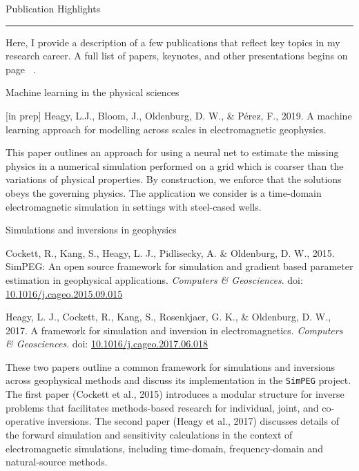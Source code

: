 \documentclass[a4paper, 11pt]{article}
\newcommand{\doi}[1]{doi: \href{https://doi.org/#1}{#1}}
\newcommand{\heading}[1]{
    \begin{minipage}[t]{\textwidth}
    \vspace{0.05cm}
    {\LARGE #1}\\
    \vspace{-0.24cm}
    \hrule
    \end{minipage}
    \vspace{0.05cm}

}
\newcommand{\subheading}[1]{
    \vspace{0.4cm}
    {\Large #1}\\
    \vspace{-0.2cm}
}
\begin{document}

\heading{Publication Highlights}

Here, I provide a description of a few publications that reflect key topics in my research career.
A full list of papers, keynotes, and other presentations begins on page ~\pageref{sec:publications}.

\subheading{Machine learning in the physical sciences}

\begin{myitemize}
    \item{[in prep] Heagy, L.J., Bloom, J., Oldenburg, D. W., \& P\'erez, F., 2019. A machine learning approach for modelling across scales in electromagnetic geophysics.}
\end{myitemize}

This paper outlines an approach for using a neural net to estimate the missing physics in a numerical simulation performed on a grid which is coarser than the variations of physical properties.
By construction, we enforce that the solutions obeys the governing physics.
The application we consider is a time-domain electromagnetic simulation in settings with steel-cased wells.

\subheading{Simulations and inversions in geophysics}

\begin{myitemize}
    \item Cockett, R., Kang, S., Heagy, L. J., Pidlisecky, A. \& Oldenburg, D. W., 2015. SimPEG: An open source framework for simulation and gradient based parameter estimation in geophysical applications. \emph{Computers \& Geosciences}. \doi{10.1016/j.cageo.2015.09.015}
    \item Heagy, L. J., Cockett, R., Kang, S., Rosenkjaer, G. K., \& Oldenburg, D. W., 2017. A framework for simulation and inversion in electromagnetics. \emph{Computers \& Geosciences}. \linebreak \doi{10.1016/j.cageo.2017.06.018}
\end{myitemize}

These two papers outline a common framework for simulations and inversions across geophysical methods and discuss its implementation in the \texttt{SimPEG} project. The first paper (Cockett et al., 2015) introduces a modular structure for inverse problems that facilitates methods-based research for individual, joint, and co-operative inversions.
The second paper (Heagy et al., 2017) discusses details of the forward simulation and sensitivity calculations in the context of electromagnetic simulations, including time-domain, frequency-domain and natural-source methods.
\end{document}

